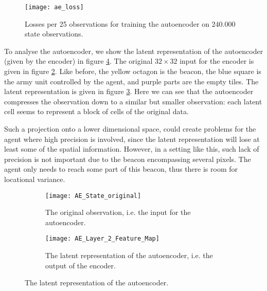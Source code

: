 \begin{figure}[h!]
    \centering
    \texttt{[image: ae\_loss]}
    \caption{Losses per 25 observations for training the autoencoder on $240.000$ state observations.}
    \label{fig:ae-loss}
\end{figure}

To analyse the autoencoder, we show the latent representation of the autoencoder (given by the encoder) in figure \ref{fig:ae-featuremap}. The original $32 \times 32$ input for the encoder is given in figure \ref{fig:ae-featuremap-original}. Like before, the yellow octagon is the beacon, the blue square is the army unit controlled by the agent, and purple parts are the empty tiles. The latent representation is given in figure \ref{fig:ae-featuremap-layer2}. Here we can see that the autoencoder compresses the observation down to a similar but smaller observation: each latent cell seems to represent a block of cells of the original data. 

Such a projection onto a lower dimensional space, could create problems for the agent where high precision is involved, since the latent representation will lose at least some of the spatial information. However, in a setting like this, such lack of precision is not important due to the beacon encompassing several pixels. The agent only needs to reach some part of this beacon, thus there is room for locational variance. 

\begin{figure}[h!]
	\centering
	\begin{subfigure}[b]{1\textwidth}
		\texttt{[image: AE\_State\_original]}
		\caption{The original observation, i.e. the input for the autoencoder.}
		\label{fig:ae-featuremap-original} 
	\end{subfigure}
	\begin{subfigure}[b]{1\textwidth}
		\texttt{[image: AE\_Layer\_2\_Feature\_Map]}
		\caption{The latent representation of the autoencoder, i.e. the output of the encoder.}
		\label{fig:ae-featuremap-layer2}
	\end{subfigure}
	\caption{The latent representation of the autoencoder.}
	\label{fig:ae-featuremap}
\end{figure}

